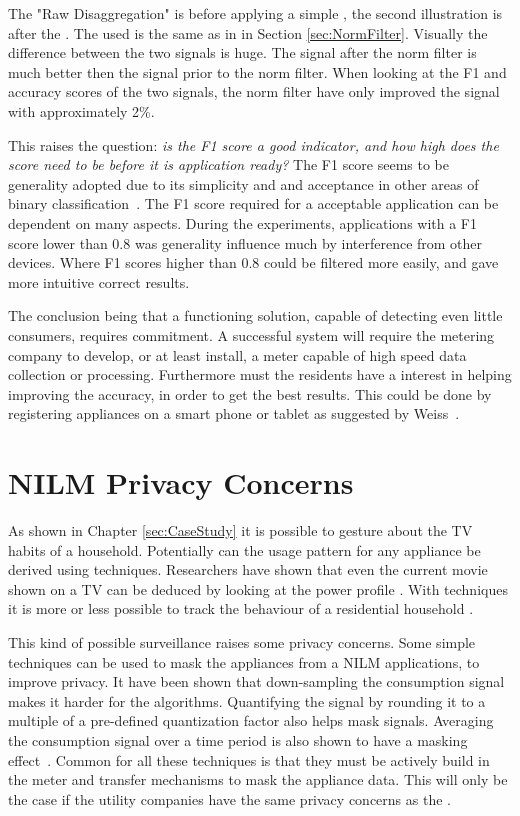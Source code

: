The "Raw Disaggregation" is before applying a simple , the second illustration is after the . The  used is the same as in in Section \ref{sec:NormFilter}. Visually the difference between the two signals is huge. The signal after the norm filter is much better then the signal prior to the norm filter. When looking at the F1 and accuracy scores of the two signals, the norm filter have only improved the signal with approximately 2\%.  

This raises the question: \textit{is the F1 score a good indicator, and how high does the score need to be before it is application ready?} The F1 score seems to be generality adopted due to its simplicity and and acceptance in other areas of binary classification~\citep{RefWorks:35}. The F1 score required for a acceptable application can be dependent on many aspects. During the experiments, applications with a F1 score lower than 0.8 was generality influence much by interference from other devices. Where F1 scores higher than 0.8 could be filtered more easily, and gave more intuitive correct results.  

The conclusion being that a functioning  solution, capable of detecting even little consumers, requires commitment. A successful system will require the metering company to develop, or at least install, a meter capable of high speed data collection or processing. Furthermore must the residents have a interest in helping improving the accuracy, in order to get the best results. This could be done by registering appliances on a smart phone or tablet as suggested by Weiss~\citep{RefWorks:23}.

\section{NILM Privacy Concerns}
As shown in Chapter \ref{sec:CaseStudy} it is possible to gesture about the TV habits of a household. Potentially can the usage pattern for any appliance be derived using  techniques. Researchers have shown that even the current movie shown on a TV can be deduced by looking at the power profile \citep{RefWorks:39}. With  techniques it is more or less possible to track the behaviour of a residential household \citep{RefWorks:37}.

This kind of possible surveillance raises some privacy concerns. Some simple techniques can be used to mask the appliances from a NILM applications, to improve privacy. It have been shown that down-sampling the consumption signal makes it harder for the  algorithms. Quantifying the signal by rounding it to a multiple of a pre-defined quantization factor also helps mask signals. Averaging the consumption signal over a time period is also shown to have a masking effect~\citep{RefWorks:40}. Common for all these techniques is that they must be actively build in the meter and transfer mechanisms to mask the appliance data. This will only be the case if the utility companies have the same privacy concerns as the . 


